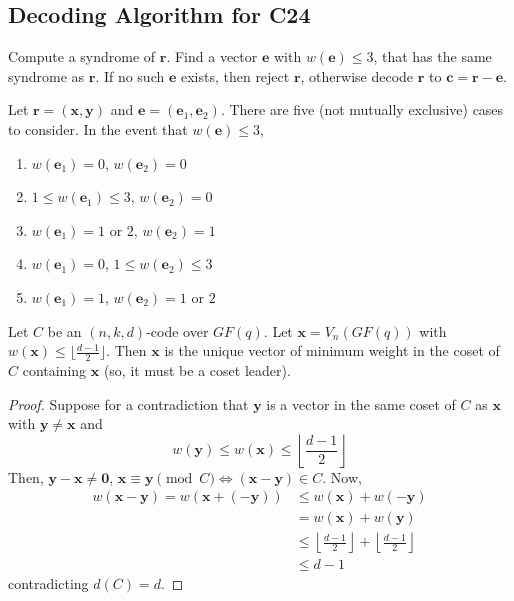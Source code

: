 \subsection{Decoding Algorithm for C24}
Compute a syndrome of $ \bm{r} $. Find a vector $ \bm{e} $ with $ w(\bm{e})\leqslant 3 $,
that has the same syndrome as $ \bm{r} $. If no such $ \bm{e} $ exists, then
reject $ \bm{r} $, otherwise decode $ \bm{r} $ to $ \bm{c}=\bm{r}-\bm{e} $.

Let $ \bm{r}=(\bm{x},\bm{y}) $ and $ \bm{e}=(\bm{e}_1,\bm{e}_2) $.
There are five (not mutually exclusive) cases to consider. In the event that
$ w(\bm{e})\leqslant 3 $,
\begin{enumerate}[label=(\Alph*)]
    \item $ w(\bm{e}_1)=0 $, $ w(\bm{e}_2)=0 $
    \item $ 1\leqslant w(\bm{e}_1)\leqslant 3 $, $ w(\bm{e}_2)=0 $
    \item $ w(\bm{e}_1)=1 $ or $ 2 $, $ w(\bm{e}_2)=1 $
    \item $ w(\bm{e}_1)=0 $, $ 1\leqslant w(\bm{e}_2)\leqslant 3 $
    \item $ w(\bm{e}_1)=1 $, $ w(\bm{e}_2)=1 $ or $ 2 $
\end{enumerate}

\begin{Theorem}{}{}
    Let $ C $ be an $ (n,k,d) $-code over $ GF(q) $. Let $ \bm{x}=
        V_n(GF(q)) $ with $ w(\bm{x})\leqslant \lfloor \frac{d-1}{2} \rfloor $.
    Then $ \bm{x} $ is the unique vector of minimum weight in the coset
    of $ C $ containing $ \bm{x} $ (so, it must be a coset leader).
\end{Theorem}

\begin{proof}
    Suppose for a contradiction that
    $ \bm{y} $ is a vector in the same coset of $ C $ as $ \bm{x} $
    with $ \bm{y}\neq \bm{x} $ and
    \[ w(\bm{y})\leqslant w(\bm{x})\leqslant \left\lfloor \frac{d-1}{2} \right\rfloor \]
    Then, $ \bm{y}-\bm{x}\neq \bm{0} $, $ \bm{x}\equiv \bm{y}\pmod{C} \iff
        (\bm{x}-\bm{y})\in C $. Now,
    \begin{align*}
        w(\bm{x}-\bm{y})=w(\bm{x}+(-\bm{y}))
         & \leqslant w(\bm{x})+w(-\bm{y})                                                                \\
         & =w(\bm{x})+w(\bm{y})                                                                          \\
         & \leqslant \left\lfloor \frac{d-1}{2} \right\rfloor + \left\lfloor \frac{d-1}{2} \right\rfloor \\
         & \leqslant d-1
    \end{align*}
    contradicting $ d(C)=d $.
\end{proof}
